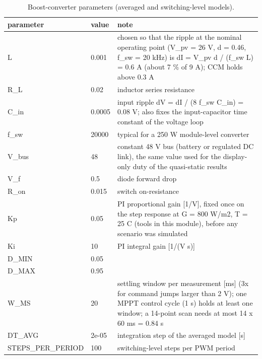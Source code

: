 \begin{table}[t]
\centering
\caption{Boost-converter parameters (averaged and switching-level models).}
\label{tab:Table_Converter_Parameters}
\small
\begin{tabular}{lll}
\hline
parameter & value & note \\
\hline
L & 0.001 & chosen so that the ripple at the nominal operating point (V\_pv = 26 V, d = 0.46, f\_sw = 20 kHz) is dI = V\_pv d / (f\_sw L) = 0.6 A (about 7 \% of 9 A); CCM holds above 0.3 A \\
R\_L & 0.02 & inductor series resistance \\
C\_in & 0.0005 & input ripple dV = dI / (8 f\_sw C\_in) = 0.08 V; also fixes the input-capacitor time constant of the voltage loop \\
f\_sw & 20000 & typical for a 250 W module-level converter \\
V\_bus & 48 & constant 48 V bus (battery or regulated DC link), the same value used for the display-only duty of the quasi-static results \\
V\_f & 0.5 & diode forward drop \\
R\_on & 0.015 & switch on-resistance \\
Kp & 0.05 & PI proportional gain [1/V], fixed once on the step response at G = 800 W/m2, T = 25 C (tools in this module), before any scenario was simulated \\
Ki & 10 & PI integral gain [1/(V s)] \\
D\_MIN & 0.05 &  \\
D\_MAX & 0.95 &  \\
W\_MS & 20 & settling window per measurement [ms] (3x for command jumps larger than 2 V); one MPPT control cycle (1 s) holds at least one window; a 14-point scan needs at most 14 x 60 ms = 0.84 s \\
DT\_AVG & 2e-05 & integration step of the averaged model [s] \\
STEPS\_PER\_PERIOD & 100 & switching-level steps per PWM period \\
\hline
\end{tabular}
\end{table}
